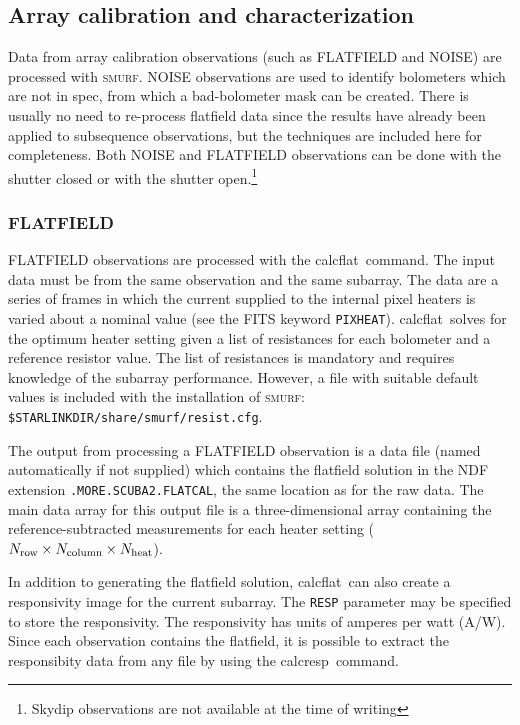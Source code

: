 \documentclass[twoside,11pt]{article}
\newcommand{\xref}[3]{#1}
\newcommand{\xlabel}[1]{}
\renewcommand{\_}{\texttt{\symbol{95}}}
\newcommand{\SMURF}{\textsc{smurf}}
\newcommand{\task}[1]{\textsf{#1}}
\newcommand{\calcflat}{\xref{\task{calcflat}}{sun258}{CALCFLAT}}
\newcommand{\calcresp}{\xref{\task{calcresp}}{sun258}{CALCRESP}}
\newcommand{\aparam}[1]{\texttt{#1}}     %
\begin{document}
\subsection{\xlabel{arraycal}Array calibration and characterization\label{se:arraycal}}

Data from array calibration observations (such as FLATFIELD and NOISE)
are processed with \SMURF. NOISE observations are used to identify
bolometers which are not in spec, from which a bad-bolometer mask can
be created. There is usually no need to re-process flatfield data
since the results have already been applied to subsequence observations, but
the techniques are included here for completeness. Both NOISE and
FLATFIELD observations can be done with the shutter closed or with the
shutter open.\footnote{Skydip observations are not available at the
  time of writing}

\subsubsection{\xlabel{flatcal}FLATFIELD\label{se:flatcal}}

FLATFIELD observations are processed with the \calcflat\ command. The
input data must be from the same observation and the same
subarray. The data are a series of frames in which the current
supplied to the internal pixel heaters is varied about a nominal value
(see the FITS keyword \texttt{PIXHEAT}). \calcflat\ solves for the
optimum heater setting given a list of resistances for each bolometer
and a reference resistor value. The list of resistances is mandatory
and requires knowledge of the subarray performance. However, a file
with suitable default values is included with the installation of
\SMURF: \texttt{\$STARLINK\_DIR/share/smurf/resist.cfg}.

The output from processing a FLATFIELD observation is a data file
(named automatically if not supplied) which contains the flatfield
solution in the NDF extension \texttt{.MORE.SCUBA2.FLATCAL}, the same
location as for the raw data. The main data array for this output file
is a three-dimensional array containing the reference-subtracted
measurements for each heater setting ($N_{\rm row}\times N_{\rm
  column} \times N_{\rm heat}$).

In addition to generating the flatfield solution, \calcflat\ can also
create a responsivity image for the current subarray. The
\aparam{RESP} parameter may be specified to store the
responsivity. The responsivity has units of amperes per watt
(A/W). Since each observation contains the flatfield, it is possible
to extract the responsibity data from any file by using the \calcresp\
command.
\end{document}
